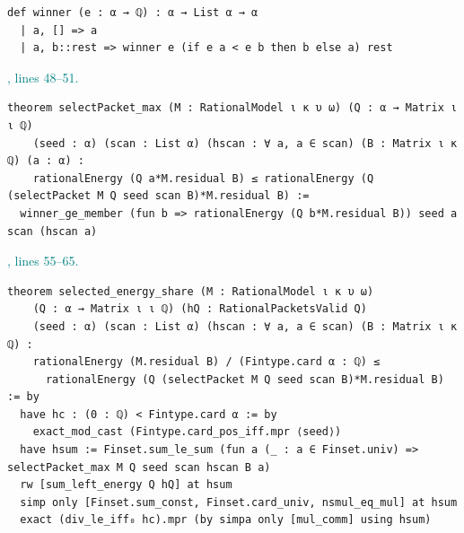 \documentclass[11pt]{article}\usepackage{needspace}\renewcommand{\paperkind}{Lean companion}\setlength{\parskip}{0.35em}
\begin{document}
\begin{lstlisting}[style=BayesSource]
def winner (e : α → ℚ) : α → List α → α
  | a, [] => a
  | a, b::rest => winner e (if e a < e b then b else a) rest
\end{lstlisting}



{\small\textcolor{teal}{, lines 48--51.}\par}

\begin{lstlisting}[style=BayesSource]
theorem selectPacket_max (M : RationalModel ι κ υ ω) (Q : α → Matrix ι ι ℚ)
    (seed : α) (scan : List α) (hscan : ∀ a, a ∈ scan) (B : Matrix ι κ ℚ) (a : α) :
    rationalEnergy (Q a*M.residual B) ≤ rationalEnergy (Q (selectPacket M Q seed scan B)*M.residual B) :=
  winner_ge_member (fun b => rationalEnergy (Q b*M.residual B)) seed a scan (hscan a)
\end{lstlisting}



{\small\textcolor{teal}{, lines 55--65.}\par}

\begin{lstlisting}[style=BayesSource]
theorem selected_energy_share (M : RationalModel ι κ υ ω)
    (Q : α → Matrix ι ι ℚ) (hQ : RationalPacketsValid Q)
    (seed : α) (scan : List α) (hscan : ∀ a, a ∈ scan) (B : Matrix ι κ ℚ) :
    rationalEnergy (M.residual B) / (Fintype.card α : ℚ) ≤
      rationalEnergy (Q (selectPacket M Q seed scan B)*M.residual B) := by
  have hc : (0 : ℚ) < Fintype.card α := by
    exact_mod_cast (Fintype.card_pos_iff.mpr ⟨seed⟩)
  have hsum := Finset.sum_le_sum (fun a (_ : a ∈ Finset.univ) => selectPacket_max M Q seed scan hscan B a)
  rw [sum_left_energy Q hQ] at hsum
  simp only [Finset.sum_const, Finset.card_univ, nsmul_eq_mul] at hsum
  exact (div_le_iff₀ hc).mpr (by simpa only [mul_comm] using hsum)
\end{lstlisting}
\end{document}
